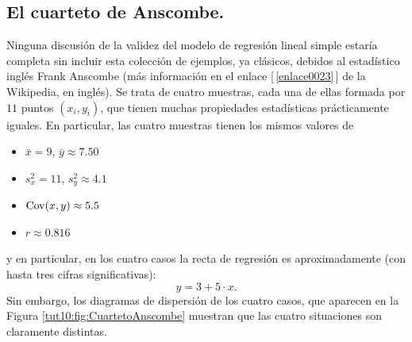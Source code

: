 \subsection{El cuarteto de Anscombe.}
\label{cap10:subsec:CuartetoAnscombe}

Ninguna discusión de la validez del modelo de regresión lineal simple estaría completa sin incluir
esta colección de ejemplos, ya clásicos, debidos al estadístico inglés Frank Anscombe (más
información en el enlace [\,\ref{enlace0023}\,]\label{enlace0023a} de la Wikipedia, en inglés). Se
trata de cuatro muestras,  cada una de ellas formada por $11$ puntos $(x_i,y_i)$, que tienen muchas
propiedades estadísticas prácticamente iguales. En particular, las cuatro muestras tienen los
mismos valores de
\begin{itemize}
  \item $\bar x=9$, \quad $\bar y\approx 7.50$
  \item $s^2_x=11$, \quad $s^2_y\approx 4.1$
  \item $\mathrm{Cov}(x,y)\approx 5.5$
  \item $r\approx 0.816$
\end{itemize}
y en particular, en los cuatro casos la recta de regresión es aproximadamente (con hasta tres cifras significativas):
\[y = 3+5\cdot x.\]
Sin embargo, los diagramas de dispersión de los cuatro casos, que aparecen en la Figura \ref{tut10:fig:CuartetoAnscombe} muestran que las cuatro situaciones son claramente distintas.
